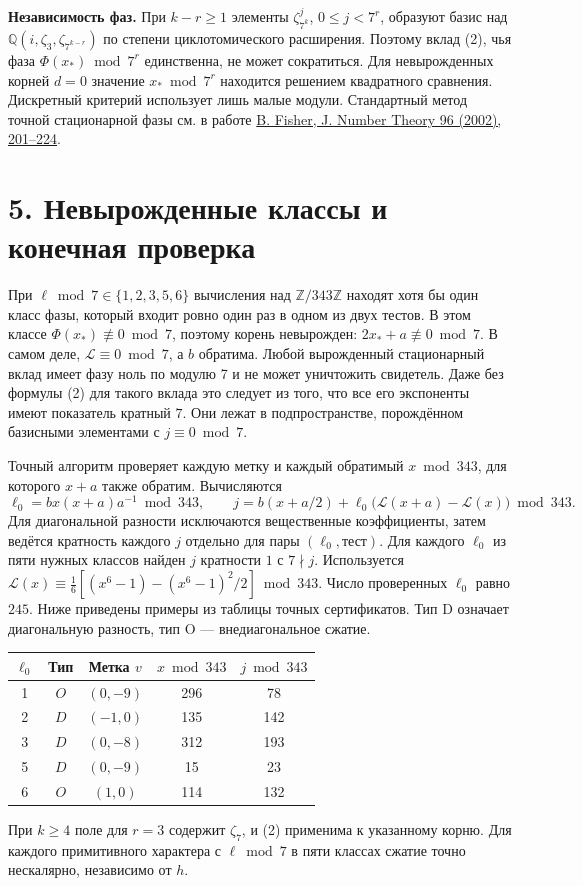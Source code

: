 \documentclass[11pt,a4paper]{article}
\newcommand{\Z}{\mathbb Z}
\newcommand{\sect}[1]{\section*{\sffamily\color{ink}#1}}
\newcommand{\subt}[1]{\par\medskip\noindent\textbf{#1.}\quad}
\newcommand{\QQ}{\mathbb Q}
\begin{document}
\subt{Независимость фаз}
При \(k-r\ge1\) элементы \(\zeta_{7^k}^j\), \(0\le j<7^r\), образуют базис над \(\QQ(i,\zeta_3,\zeta_{7^{k-r}})\) по степени циклотомического расширения. Поэтому вклад (2), чья фаза \(\Phi(x_*)\bmod7^r\) единственна, не может сократиться. Для невырожденных корней \(d=0\) значение \(x_*\bmod7^r\) находится решением квадратного сравнения. Дискретный критерий использует лишь малые модули. Стандартный метод точной стационарной фазы см. в работе \href{https://doi.org/10.1006/jnth.2002.2790}{B. Fisher, J. Number Theory 96 (2002), 201--224}.
\newpage
\sect{5. Невырожденные классы и конечная проверка}
При \(\ell\bmod7\in\{1,2,3,5,6\}\) вычисления над \(\Z/343\Z\) находят хотя бы один класс фазы, который входит ровно один раз в одном из двух тестов. В этом классе \(\Phi(x_*)\not\equiv0\bmod7\), поэтому корень невырожден: \(2x_*+a\not\equiv0\bmod7\). В самом деле, \(\mathcal L\equiv0\bmod7\), а \(b\) обратима. Любой вырожденный стационарный вклад имеет фазу ноль по модулю 7 и не может уничтожить свидетель. Даже без формулы (2) для такого вклада это следует из того, что все его экспоненты имеют показатель кратный \(7\). Они лежат в подпространстве, порождённом базисными элементами с \(j\equiv0\bmod7\).

Точный алгоритм проверяет каждую метку и каждый обратимый \(x\bmod343\), для которого \(x+a\) также обратим. Вычисляются
\[
  \ell_0=b x(x+a)a^{-1}\bmod343,\qquad
  j=b(x+a/2)+\ell_0\big(\mathcal L(x+a)-\mathcal L(x)\big)\bmod343 .
\]
Для диагональной разности исключаются вещественные коэффициенты, затем ведётся кратность каждого \(j\) отдельно для пары \((\ell_0,\text{тест})\). Для каждого \(\ell_0\) из пяти нужных классов найден \(j\) кратности \(1\) с \(7\nmid j\). Используется
\(\mathcal L(x)\equiv\tfrac16[(x^6-1)-(x^6-1)^2/2]\bmod343\).
Число проверенных \(\ell_0\) равно \(245\). Ниже приведены примеры из таблицы точных сертификатов. Тип \(\mathrm{D}\) означает диагональную разность, тип \(\mathrm{O}\) --- внедиагональное сжатие.
\begin{center}
\begin{tabular}{ccccc}
\toprule
\(\ell_0\) & Тип & Метка \(v\) & \(x\bmod343\) & \(j\bmod343\) \\
\midrule
1 & \(O\) & \((0,-9)\) & 296 & 78\\
2 & \(D\) & \((-1,0)\) & 135 & 142\\
3 & \(D\) & \((0,-8)\) & 312 & 193\\
5 & \(D\) & \((0,-9)\) & 15 & 23\\
6 & \(O\) & \((1,0)\) & 114 & 132\\
\bottomrule
\end{tabular}
\end{center}
При \(k\ge4\) поле для \(r=3\) содержит \(\zeta_7\), и (2) применима к указанному корню. Для каждого примитивного характера с \(\ell\bmod7\) в пяти классах сжатие точно нескалярно, независимо от \(h\).
\end{document}
